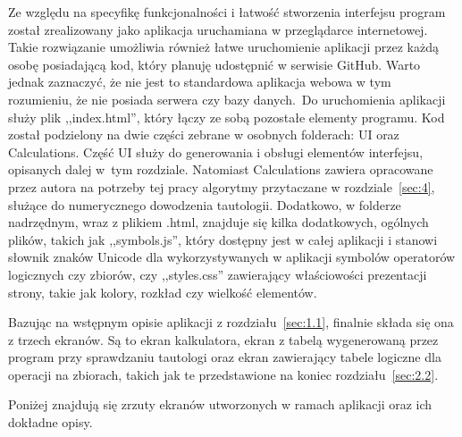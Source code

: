 \documentclass{SGGW-thesis}
\begin{document}
\begin{paragraph}{}
     Ze względu na specyfikę funkcjonalności i łatwość stworzenia interfejsu program został zrealizowany jako aplikacja uruchamiana w przeglądarce internetowej. Takie rozwiązanie umożliwia również łatwe uruchomienie aplikacji przez każdą osobę posiadającą kod, który planuję udostępnić w serwisie GitHub. Warto jednak zaznaczyć, że nie jest to standardowa aplikacja webowa w tym rozumieniu, że nie posiada serwera czy bazy danych. Do uruchomienia aplikacji służy plik ,,index.html'', który łączy ze sobą pozostałe elementy programu. Kod został podzielony na dwie części zebrane w osobnych folderach: UI oraz Calculations. Część UI służy do generowania i obsługi elementów interfejsu, opisanych dalej w~tym rozdziale. Natomiast Calculations zawiera opracowane przez autora na potrzeby tej pracy algorytmy przytaczane w rozdziale~\ref{sec:4}, służące do numerycznego dowodzenia tautologii. Dodatkowo, w folderze nadrzędnym, wraz z plikiem .html, znajduje się kilka dodatkowych, ogólnych plików, takich jak ,,symbols.js'', który dostępny jest w całej aplikacji i stanowi słownik znaków Unicode dla wykorzystywanych w aplikacji symbolów operatorów logicznych czy zbiorów, czy ,,styles.css'' zawierający właściowości prezentacji strony, takie jak kolory, rozkład czy wielkość elementów.

     Bazując na wstępnym opisie aplikacji z rozdziału~\ref{sec:1.1}, finalnie składa się ona z trzech ekranów. Są to ekran kalkulatora, ekran z tabelą wygenerowaną przez program przy sprawdzaniu tautologi oraz ekran zawierający tabele logiczne dla operacji na zbiorach, takich jak te przedstawione na koniec rozdziału~\ref{sec:2.2}.
    
    Poniżej znajdują się zrzuty ekranów utworzonych w ramach aplikacji oraz ich dokładne opisy.
\end{paragraph}

\newpage
\end{document}
